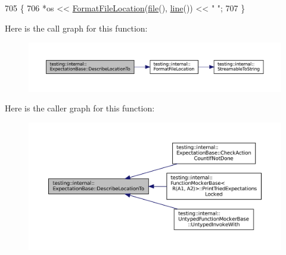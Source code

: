 \begin{DoxyCode}
705                                                 \{
706     *os << \hyperlink{namespacetesting_1_1internal_a31b7c3abed4a7c395f42c61e993989f4}{FormatFileLocation}(\hyperlink{classtesting_1_1internal_1_1ExpectationBase_ad8aae77623dbddd5d2099ea6499eda53}{file}(), \hyperlink{classtesting_1_1internal_1_1ExpectationBase_a6a44d831449d31e0e46d0070625b452c}{line}()) << \textcolor{stringliteral}{" "};
707   \}
\end{DoxyCode}
Here is the call graph for this function\+:
\nopagebreak
\begin{figure}[H]
\begin{center}
\leavevmode
\includegraphics[width=350pt]{classtesting_1_1internal_1_1ExpectationBase_a666e7f8fb2412e78f090244e6bfd4493_cgraph}
\end{center}
\end{figure}
Here is the caller graph for this function\+:
\nopagebreak
\begin{figure}[H]
\begin{center}
\leavevmode
\includegraphics[width=350pt]{classtesting_1_1internal_1_1ExpectationBase_a666e7f8fb2412e78f090244e6bfd4493_icgraph}
\end{center}
\end{figure}
\mbox{\label{classtesting_1_1internal_1_1ExpectationBase_a652adbe3fcca2950175e3859d59af268}} 
